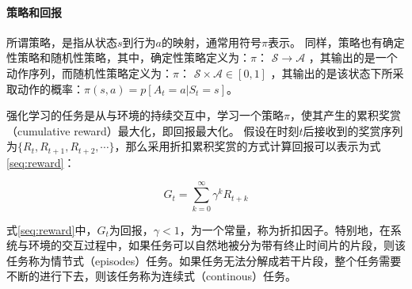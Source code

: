 




\paragraph{策略和回报}
所谓策略，是指从状态$s$到行为$a$的映射，通常用符号$\pi$表示。
同样，策略也有确定性策略和随机性策略，其中，确定性策略定义为：$\pi$： $\mathcal{S} \to \mathcal{A}$ ，其输出的是一个动作序列，而随机性策略定义为：$\pi$： $\mathcal{S} \times \mathcal{A} \in [0,1]$ ，其输出的是该状态下所采取动作的概率：$\pi(s,a)=p[A_{t}=a|S_{t}=s]$。

强化学习的任务是从与环境的持续交互中，学习一个策略$\pi$，使其产生的累积奖赏（cumulative reward）最大化，即回报最大化。
假设在时刻$t$后接收到的奖赏序列为$\{R_{t}, R_{t+1}, R_{t+2},\cdots\}$，那么采用折扣累积奖赏的方式计算回报可以表示为式\eqref{seq:reward}：

\begin{equation}\label{seq:reward}
G_{t}=\sum_{k=0}^{\infty}\gamma^{k}R_{t+k}
\end{equation}

式\eqref{seq:reward}中，$G_{t}$为回报，$\gamma<1$，为一个常量，称为折扣因子。特别地，在系统与环境的交互过程中，如果任务可以自然地被分为带有终止时间片的片段，则该任务称为情节式（episodes）任务。如果任务无法分解成若干片段，整个任务需要不断的进行下去，则该任务称为连续式（continous）任务。

